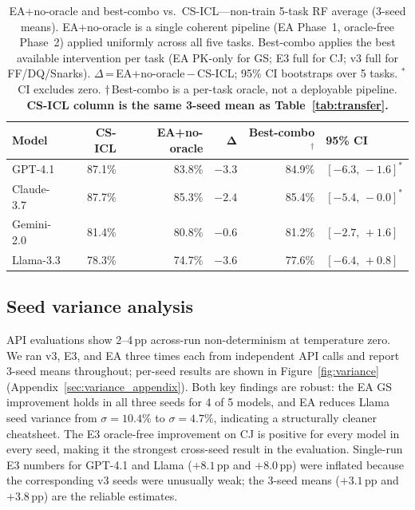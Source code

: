 \documentclass{article}
\begin{document}
\begin{table}[t]
  \caption{EA+no-oracle and best-combo vs.\ CS-ICL---non-train 5-task RF average (3-seed means).
    EA+no-oracle is a single coherent pipeline (EA Phase~1, oracle-free Phase~2) applied
    uniformly across all five tasks.
    Best-combo applies the best available intervention per task (EA PK-only for GS;
    E3 full for CJ; v3 full for FF/DQ/Snarks).
    $\Delta$\,=\,EA+no-oracle\,$-$\,CS-ICL; 95\% CI bootstraps over 5 tasks.
    $^{*}$\,CI excludes zero. $\dagger$\,Best-combo is a per-task oracle, not a deployable pipeline.
    \textbf{CS-ICL column is the same 3-seed mean as Table~\ref{tab:transfer}.}}
  \label{tab:combined}
  \centering
  \smallskip
  \begin{tabular}{lrrrrl}
    \toprule
    \textbf{Model} & \textbf{CS-ICL} & \textbf{EA+no-oracle} & $\boldsymbol{\Delta}$ & \textbf{Best-combo$^\dagger$} & \textbf{95\% CI} \\
    \midrule
    GPT-4.1    & 87.1\% & 83.8\% & $-3.3$ & 84.9\% & $[-6.3,\,-1.6]^{*}$ \\
    Claude-3.7 & 87.7\% & 85.3\% & $-2.4$ & 85.4\% & $[-5.4,\,-0.0]^{*}$ \\
    Gemini-2.0 & 81.4\% & 80.8\% & $-0.6$ & 81.2\% & $[-2.7,\,+1.6]$ \\
    Llama-3.3  & 78.3\% & 74.7\% & $-3.6$ & 77.6\% & $[-6.4,\,+0.8]$ \\
    \bottomrule
  \end{tabular}
\end{table}




\subsection{Seed variance analysis}
\label{sec:variance}

API evaluations show 2--4\,pp across-run non-determinism at temperature zero.
We ran v3, E3, and EA three times each from independent API calls and report 3-seed means
throughout; per-seed results are shown in Figure~\ref{fig:variance}
(Appendix~\ref{sec:variance_appendix}).
Both key findings are robust: the EA GS improvement holds in all three seeds for 4 of 5 models,
and EA reduces Llama seed variance from $\sigma=10.4\%$ to $\sigma=4.7\%$, indicating a
structurally cleaner cheatsheet.
The E3 oracle-free improvement on CJ is positive for every model in every seed, making it the strongest
cross-seed result in the evaluation.
Single-run E3 numbers for GPT-4.1 and Llama ($+8.1$\,pp and $+8.0$\,pp) were inflated because
the corresponding v3 seeds were unusually weak; the 3-seed means ($+3.1$\,pp and $+3.8$\,pp)
are the reliable estimates.
\end{document}
